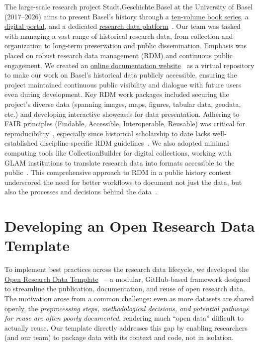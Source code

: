 \documentclass{anthology-ch}         %
\begin{document}
The large-scale research project Stadt.Geschichte.Basel at the University of Basel (2017--2026) aims to present Basel's history through a \href{https://emono.unibas.ch/stadtgeschichtebasel/}{ten-volume book series}, a \href{https://stadtgeschichtebasel.ch/}{digital portal}, and a dedicated \href{https://forschung.stadtgeschichtebasel.ch/}{research data platform}~\cite{goerlich2023}. Our team was tasked with managing a vast range of historical research data, from collection and organization to long-term preservation and public dissemination. Emphasis was placed on robust research data management (RDM) and continuous public engagement. We created an \href{https://dokumentation.stadtgeschichtebasel.ch/}{online documentation website}~\cite{maehr2024g} as a virtual repository to make our work on Basel's historical data publicly accessible, ensuring the project maintained continuous public visibility and dialogue with future users even during development. Key RDM work packages included securing the project's diverse data (spanning images, maps, figures, tabular data, geodata, etc.) and developing interactive showcases for data presentation. Adhering to FAIR principles (Findable, Accessible, Interoperable, Reusable) was critical for reproducibility~\cite{wilkinson2016}, especially since historical scholarship to date lacks well-established discipline-specific RDM guidelines~\cite{hiltmann2018, ruediger2023}. We also adopted minimal computing tools like CollectionBuilder for digital collections, working with GLAM institutions to translate research data into formats accessible to the public~\cite{mahr2023g}. This comprehensive approach to RDM in a public history context underscored the need for better workflows to document not just the data, but also the processes and decisions behind the data~\cite{borgman2012}.

\section{Developing an Open Research Data Template}\label{developing-an-open-research-data-template}

To implement best practices across the research data lifecycle, we developed the \href{https://github.com/maehr/open-research-data-template}{Open Research Data Template}~\cite{mahr2023g} -- a modular, GitHub-based framework designed to streamline the publication, documentation, and reuse of open research data. The motivation arose from a common challenge: even as more datasets are shared openly, the \emph{preprocessing steps, methodological decisions, and potential pathways for reuse are often poorly documented}, rendering much ``open data'' difficult to actually reuse. Our template directly addresses this gap by enabling researchers (and our team) to package data with its context and code, not in isolation.
\end{document}
